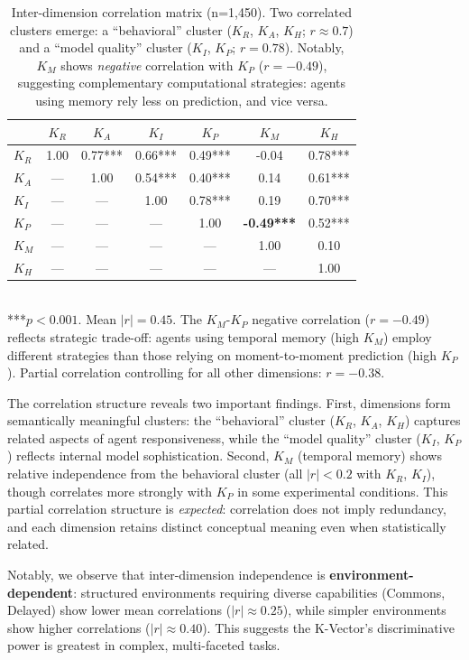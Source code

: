 \documentclass[11pt,a4paper]{article}
\newcommand{\kr}{K_R}
\newcommand{\ka}{K_A}
\newcommand{\ki}{K_I}
\newcommand{\kp}{K_P}
\newcommand{\km}{K_M}
\newcommand{\kh}{K_H}
\begin{document}
\begin{table}[h]
\centering
\caption{Inter-dimension correlation matrix (n=1,450). Two correlated clusters emerge: a ``behavioral'' cluster ($\kr$, $\ka$, $\kh$; $r \approx 0.7$) and a ``model quality'' cluster ($\ki$, $\kp$; $r = 0.78$). Notably, $\km$ shows \emph{negative} correlation with $\kp$ ($r = -0.49$), suggesting complementary computational strategies: agents using memory rely less on prediction, and vice versa.}
\label{tab:correlations}
\begin{tabular}{lcccccc}
\toprule
 & $\kr$ & $\ka$ & $\ki$ & $\kp$ & $\km$ & $\kh$ \\
\midrule
$\kr$ & 1.00 & 0.77*** & 0.66*** & 0.49*** & -0.04 & 0.78*** \\
$\ka$ & --- & 1.00 & 0.54*** & 0.40*** & 0.14 & 0.61*** \\
$\ki$ & --- & --- & 1.00 & 0.78*** & 0.19 & 0.70*** \\
$\kp$ & --- & --- & --- & 1.00 & \textbf{-0.49***} & 0.52*** \\
$\km$ & --- & --- & --- & --- & 1.00 & 0.10 \\
$\kh$ & --- & --- & --- & --- & --- & 1.00 \\
\bottomrule
\end{tabular}
\\[1ex]
\footnotesize{***$p < 0.001$. Mean $|r| = 0.45$. The $\km$-$\kp$ negative correlation ($r = -0.49$) reflects strategic trade-off: agents using temporal memory (high $\km$) employ different strategies than those relying on moment-to-moment prediction (high $\kp$). Partial correlation controlling for all other dimensions: $r = -0.38$.}
\end{table}

The correlation structure reveals two important findings. First, dimensions form semantically meaningful clusters: the ``behavioral'' cluster ($\kr$, $\ka$, $\kh$) captures related aspects of agent responsiveness, while the ``model quality'' cluster ($\ki$, $\kp$) reflects internal model sophistication. Second, $\km$ (temporal memory) shows relative independence from the behavioral cluster (all $|r| < 0.2$ with $\kr$, $\ki$), though correlates more strongly with $\kp$ in some experimental conditions. This partial correlation structure is \emph{expected}: correlation does not imply redundancy, and each dimension retains distinct conceptual meaning even when statistically related.

Notably, we observe that inter-dimension independence is \textbf{environment-dependent}: structured environments requiring diverse capabilities (Commons, Delayed) show lower mean correlations ($|r| \approx 0.25$), while simpler environments show higher correlations ($|r| \approx 0.40$). This suggests the K-Vector's discriminative power is greatest in complex, multi-faceted tasks.
\end{document}
